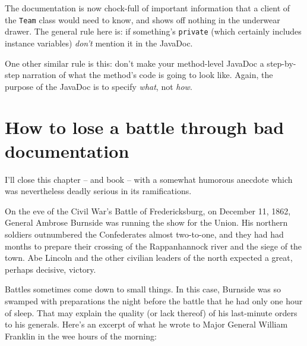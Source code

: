 The documentation is now chock-full of important information that a client of
the \texttt{Team} class would need to know, and shows off nothing in the
underwear drawer. The general rule here is: if something's \texttt{private}
(which certainly includes instance variables) \textit{don't} mention it in the
JavaDoc.

\medskip


One other similar rule is this: don't make your method-level JavaDoc a
step-by-step narration of what the method's code is going to look like. Again,
the purpose of the JavaDoc is to specify \textit{what}, not \textit{how}.

\section[How to lose a battle]{How to lose a battle through bad documentation}

I'll close this chapter -- and book -- with a somewhat humorous anecdote which
was nevertheless deadly serious in its ramifications.

On the eve of the Civil War's Battle of Fredericksburg, on December 11, 1862,
General Ambrose Burnside was running the show for the Union. His northern
soldiers outnumbered the Confederates almost two-to-one, and they had had
months to prepare their crossing of the Rappanhannock river and the siege of
the town. Abe Lincoln and the other civilian leaders of the north expected a
great, perhaps decisive, victory.

Battles sometimes come down to small things. In this case, Burnside was so
swamped with preparations the night before the battle that he had only one
hour of sleep. That may explain the quality (or lack thereof) of his
last-minute orders to his generals. Here's an excerpt of what he wrote to
Major General William Franklin in the wee hours of the morning:


\begin{center}
\large
{}
\end{center}


